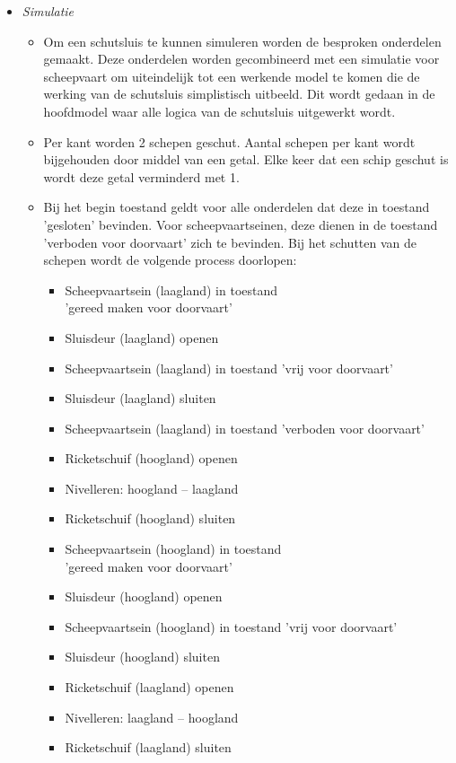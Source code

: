 \documentclass{article}
\begin{document}
\begin{itemize}
        \item \textit{Simulatie}
        \begin{itemize}
            \item Om een schutsluis te kunnen simuleren worden de besproken onderdelen gemaakt.
            Deze onderdelen worden gecombineerd met een simulatie voor scheepvaart om uiteindelijk
            tot een werkende model te komen die de werking van de schutsluis simplistisch uitbeeld.
            Dit wordt gedaan in de hoofdmodel waar alle logica van de schutsluis uitgewerkt wordt.
            \item Per kant worden 2 schepen geschut. Aantal schepen per kant wordt bijgehouden
            door middel van een getal. Elke keer dat een schip geschut is wordt deze getal verminderd met 1.
            \item Bij het begin toestand geldt voor alle onderdelen dat deze in toestand 'gesloten' bevinden.
            Voor scheepvaartseinen, deze dienen in de toestand 'verboden voor doorvaart' zich te bevinden. 
            Bij het schutten van de schepen wordt de volgende process doorlopen:\\
                \begin{itemize}
                    \item Scheepvaartsein (laagland) in toestand \\'gereed maken voor doorvaart'
                    \item Sluisdeur (laagland) openen
                    \item Scheepvaartsein (laagland) in toestand 'vrij voor doorvaart'
                    \item Sluisdeur (laagland) sluiten
                    \item Scheepvaartsein (laagland) in toestand 'verboden voor doorvaart'
                    \item Ricketschuif (hoogland) openen
                    \item Nivelleren: hoogland --\> laagland
                    \item Ricketschuif (hoogland) sluiten
                    \item Scheepvaartsein (hoogland) in toestand \\'gereed maken voor doorvaart'
                    \item Sluisdeur (hoogland) openen
                    \item Scheepvaartsein (hoogland) in toestand 'vrij voor doorvaart'
                    \item Sluisdeur (hoogland) sluiten
                    \item Ricketschuif (laagland) openen
                    \item Nivelleren: laagland --\> hoogland
                    \item Ricketschuif (laagland) sluiten
                \end{itemize}
        \end{itemize}
    \end{itemize}
\end{document}
